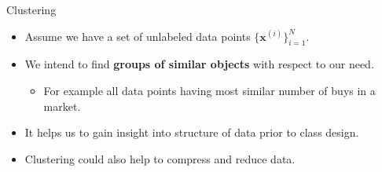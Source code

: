 \documentclass[serif, aspectratio=169]{beamer}
\begin{document}
\begin{frame}{Clustering}
    \begin{minipage}{0.95\textwidth}
        \begin{itemize}
        \item Assume we have a set of unlabeled data points $ \{ \mathbf{x}^{(i)} \}_{i=1}^N$.
        \item We intend to find \textbf{groups of similar objects} with respect to our need.
        \begin{itemize}
            \item For example all data points having most similar number of buys in a market.
        \end{itemize}
        \item It helps us to gain insight into structure of data prior to class design.
        \item Clustering could also help to compress and reduce data.
    \end{itemize}
    \end{minipage}%
\end{frame}
\end{document}
